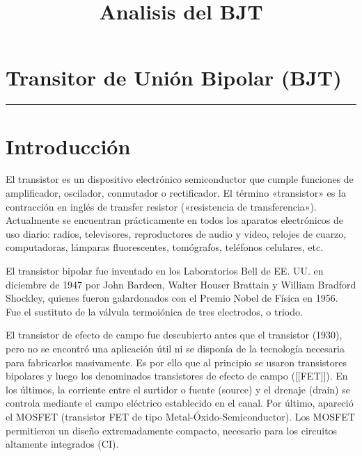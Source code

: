 \documentclass{article}
\title{Analisis del BJT}
\begin{document}
    
    
    \maketitle
    
    

    
    \section{Transitor de Unión Bipolar
(BJT)}\label{transitor-de-uniuxf3n-bipolar-bjt}

\begin{center}\rule{3in}{0.4pt}\end{center}

    \section{Introducción}\label{introducciuxf3n}

El transistor es un dispositivo electrónico semiconductor que cumple
funciones de amplificador, oscilador, conmutador o rectificador. El
término «transistor» es la contracción en inglés de transfer resistor
(«resistencia de transferencia»). Actualmente se encuentran
prácticamente en todos los aparatos electrónicos de uso diario: radios,
televisores, reproductores de audio y video, relojes de cuarzo,
computadoras, lámparas fluorescentes, tomógrafos, teléfonos celulares,
etc.

El transistor bipolar fue inventado en los Laboratorios Bell de EE. UU.
en diciembre de 1947 por John Bardeen, Walter Houser Brattain y William
Bradford Shockley, quienes fueron galardonados con el Premio Nobel de
Física en 1956. Fue el sustituto de la válvula termoiónica de tres
electrodos, o triodo.

El transistor de efecto de campo fue descubierto antes que el transistor
(1930), pero no se encontró una aplicación útil ni se disponía de la
tecnología necesaria para fabricarlos masivamente. Es por ello que al
principio se usaron transistores bipolares y luego los denominados
transistores de efecto de campo ({[}{[}FET{]}{]}). En los últimos, la
corriente entre el surtidor o fuente (source) y el drenaje (drain) se
controla mediante el campo eléctrico establecido en el canal. Por
último, apareció el MOSFET (transistor FET de tipo
Metal-Óxido-Semiconductor). Los MOSFET permitieron un diseño
extremadamente compacto, necesario para los circuitos altamente
integrados (CI).
\end{document}
